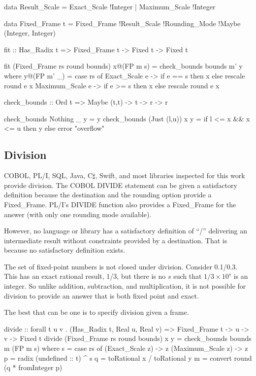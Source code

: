 \documentclass{article}
\begin{document}
\begin{code}
\begin{code}
data Result_Scale
   = Exact_Scale   !Integer
   | Maximum_Scale !Integer

data Fixed_Frame t
   = Fixed_Frame !Result_Scale !Rounding_Mode
                 !Maybe (Integer, Integer)

fit :: Has_Radix t =>
       Fixed_Frame t -> Fixed t -> Fixed t

fit (Fixed_Frame rs round bounds) x@(FP m s)
  = check_bounds bounds m' y
  where
    y@(FP m' _) =
      case rs of
        Exact_Scale e   -> if e == s then x else
                           rescale round e x
        Maximum_Scale e -> if e >= s then x else
                           rescale round e x

check_bounds :: Ord t => Maybe (t,t) -> t -> r -> r

check_bounds Nothing      _ y = y
check_bounds (Just (l,u)) x y =
  if l <= x && x <= u then y else error "overflow"

\end{code}

\subsection{Division}

COBOL, PL/I, SQL, Java, C$\sharp$, Swift, and most libraries
inspected for this work provide division.  The COBOL
DIVIDE statement can be given a satisfactory definition because
the destination and the rounding option provide a Fixed\_Frame.
PL/I's DIVIDE function also provides a Fixed\_Frame for the
answer (with only one rounding mode available).

However, no language or library has a satisfactory definition of
``/'' delivering an intermediate result without constraints
provided by a destination.  That is because no satisfactory
definition exists.

The set of fixed-point numbers is not closed under division.
Consider 0.1/0.3.  This has an exact rational result, 1/3,
but there is no $s$ such that $1/3 \times 10^s$ is an integer.
So unlike addition, subtraction, and multiplication, it is not
possible for division to provide an answer that is both fixed
point and exact.

The best that can be one is to specify division given a frame.

\begin{code}
divide :: forall t u v . (Has_Radix t, Real u, Real v) =>
          Fixed_Frame t -> u -> v -> Fixed t
divide (Fixed_Frame rs round bounds) x y
  = check_bounds bounds m (FP m s)
  where
    s = case rs of
          (Exact_Scale   z) -> z
          (Maximum_Scale z) -> z
    p = radix (undefined :: t) ^ s
    q = toRational x / toRational y
    m = convert round (q * fromInteger p)
\end{code}


\end{code}
\end{document}
